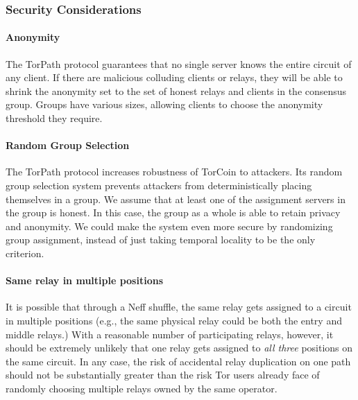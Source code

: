 \subsubsection{Security Considerations} 

\paragraph{Anonymity} The TorPath protocol guarantees that no single
server knows the entire circuit of any client. If there are malicious
colluding clients or relays, they will be able to shrink the anonymity set to
the set of honest relays and clients in the consensus group.  Groups have
various sizes, allowing clients to choose the anonymity threshold they
require.

\paragraph{Random Group Selection} The TorPath protocol increases
robustness of TorCoin to attackers. Its random group selection system prevents
attackers from deterministically placing themselves in a group. We assume that
at least one of the assignment servers in the group is honest. In this case,
the group as a whole is able to retain privacy and anonymity. We could make
the system even more secure by randomizing group assignment, instead of just
taking temporal locality to be the only criterion.

\paragraph{Same relay in multiple positions}  It is possible that through
a Neff shuffle, the same relay gets assigned to a circuit in multiple
positions (e.g., the same physical relay could be both the entry and middle
relays.) With a reasonable number of participating relays, however,
it should be extremely unlikely that one relay gets assigned
to {\em all three} positions on the same circuit.
In any case, the risk of accidental relay duplication on one path
should not be substantially greater than the risk
Tor users already face of randomly choosing multiple relays
owned by the same operator.